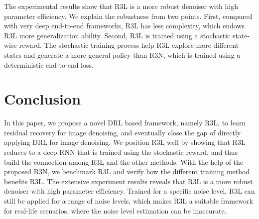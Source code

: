 \documentclass{article}
\begin{document}
The experimental results show that R3L is a more robust denoiser with high parameter efficiency. We explain the robustness from two points. First, compared with very deep end-to-end frameworks, R3L has less complexity, which endows R3L more generalization ability. Second, R3L is trained using a stochastic state-wise reward. The stochastic training process help R3L explore more different states and generate a more general policy than R3N, which is trained using a deterministic end-to-end loss. 

\begin{table}[htbp]
\caption{The average PSNR (dB) results of different methods.All the methods are set/trained with . The best and the second best results are highlighted in \textcolor{red}{red} and \textcolor{blue}{blue} respectively.} \label{tab:35}
\centering
{}
\end{table}
\section{Conclusion}
In this paper, we propose a novel DRL based framework, namely R3L, to learn residual recovery for image denoising, and eventually close the gap of directly applying DRL for image denoising. We position R3L well by showing that R3L reduces to a deep RNN that is trained using the stochastic reward, and thus build the connection among R3L and the other methods. With the help of the proposed R3N, we benchmark R3L and verify how the different training method benefits R3L. The extensive experiment  results  reveals  that  R3L  is  a more  robust  denoiser  with  high parameter efficiency. Trained for a specific noise level, R3L can still be applied for a range of noise levels, which makes R3L a suitable framework for real-life scenarios, where the noise level estimation can be inaccurate.








\end{document}
